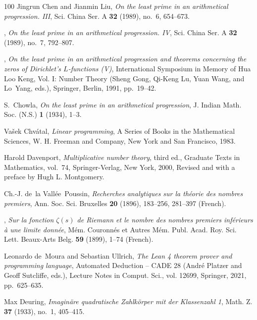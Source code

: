 \documentclass[11pt]{amsart}
\numberwithin{equation}{section}
\theoremstyle{plain}
\theoremstyle{definition}
\theoremstyle{remark}
\newcommand{\1}{\mathbf{1}}
\begin{document}
\begin{thebibliography}{100}
Jingrun Chen and Jianmin Liu, \emph{On the least prime in an arithmetical
  progression. {III}}, Sci. China Ser. A \textbf{32} (1989), no.~6, 654--673.

\bysame, \emph{On the least prime in an arithmetical progression. {IV}}, Sci.
  China Ser. A \textbf{32} (1989), no.~7, 792--807. 

\bysame, \emph{On the least prime in an arithmetical progression and theorems
  concerning the zeros of {D}irichlet's {$L$}-functions ({V})}, International
  Symposium in Memory of Hua Loo Keng, Vol. I: Number Theory (Sheng Gong,
  Qi-Keng Lu, Yuan Wang, and Lo~Yang, eds.), Springer, Berlin, 1991,
  pp.~19--42.

S.~Chowla, \emph{On the least prime in an arithmetical progression}, J. Indian
  Math. Soc. (N.S.) \textbf{1} (1934), 1--3.

Va{\v{s}}ek Chv{\'a}tal, \emph{Linear programming}, A Series of Books in the
  Mathematical Sciences, W. H. Freeman and Company, New York and San Francisco,
  1983.

Harold Davenport, \emph{Multiplicative number theory}, third ed., Graduate
  Texts in Mathematics, vol.~74, Springer-Verlag, New York, 2000, Revised and
  with a preface by Hugh L. Montgomery.

Ch.-J. de~la Vall{\'e}e~Poussin, \emph{Recherches analytiques sur la
  th{\'e}orie des nombres premiers}, Ann. Soc. Sci. Bruxelles \textbf{20}
  (1896), 183--256, 281--397 (French).

\bysame, \emph{Sur la fonction {$\zeta(s)$} de {R}iemann et le nombre des
  nombres premiers inf{\'e}rieurs {\`a} une limite donn{\'e}e}, M{\'e}m.
  Couronn{\'e}s et Autres M{\'e}m. Publ. Acad. Roy. Sci. Lett. Beaux-Arts Belg.
  \textbf{59} (1899), 1--74 (French).

Leonardo de~Moura and Sebastian Ullrich, \emph{The {L}ean 4 theorem prover and
  programming language}, Automated Deduction -- {CADE} 28 (Andr{\'e} Platzer
  and Geoff Sutcliffe, eds.), Lecture Notes in Comput. Sci., vol. 12699,
  Springer, 2021, pp.~625--635.

Max Deuring, \emph{Imagin{\"a}re quadratische {Z}ahlk{\"o}rper mit der
  {K}lassenzahl 1}, Math. Z. \textbf{37} (1933), no.~1, 405--415.


\end{thebibliography}
\end{document}
